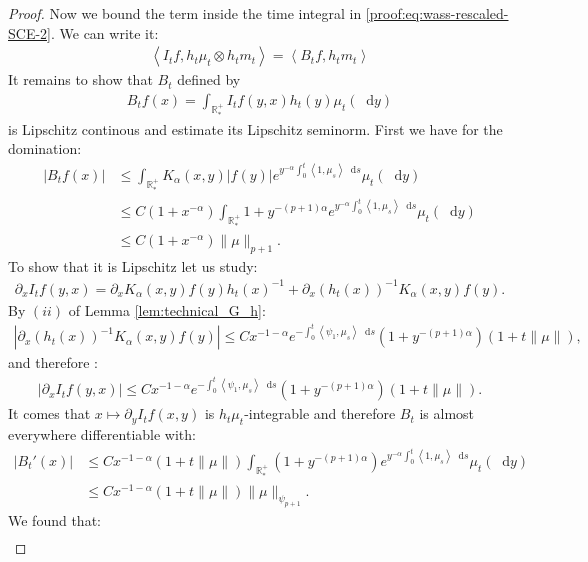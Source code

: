 \documentclass[11pt,a4paper]{article}
\newcommand{\RRP}{\mathbb{R}^+_*}
\newcommand{\brac}[1]{\left\langle#1\right\rangle}
\newcommand{\dd}{\mathop{}\!\mathrm{d}}
\begin{document}
\begin{proof}
    Now we bound the term inside the time integral in \eqref{proof:eq:wass-rescaled-SCE-2}. We can write it:
    \begin{align*}
        \brac{I_tf,h_t\mu_t \otimes h_t m_t} = \brac{B_tf,h_tm_t}
    \end{align*}
    It remains to show that $B_t$ defined by
    \begin{align*}
        B_tf(x) = \int_{\RRP} I_tf(y,x) h_t(y) \mu_t(\dd y)
    \end{align*}
    is Lipschitz continous and estimate its Lipschitz seminorm. First we have for the domination:
    \begin{align*}
        \left|B_tf(x) \right| 
        &\leq \int_{\RRP} K_\alpha(x,y)\left|f(y) \right| e^{ y^{-\alpha} \int_0^t \brac{1,\mu_s} \dd s} \mu_t(\dd y) \\
        &\leq C(1 + x^{-\alpha})\int_{\RRP} 1 + y^{-(p+1)\alpha} e^{y^{-\alpha}\int_0^t \brac{1,\mu_s} \dd s} \mu_t(\dd y) \\
        &\leq C(1 + x^{-\alpha}) \|\mu\|_{p+1}.
    \end{align*}
    To show that it is Lipschitz let us study:
    \begin{align*}
        \partial_x I_tf(y,x) = \partial_x K_\alpha(x,y)f(y)h_t(x)^{-1} + \partial_x \left(h_t(x)\right)^{-1} K_\alpha(x,y)f(y).
    \end{align*}
    By $(ii)$ of Lemma \ref{lem:technical_G_h}:
    \begin{align*}
        \left| \partial_x \left(h_t(x)\right)^{-1} K_\alpha(x,y)f(y)\right| \leq  C x^{-1-\alpha} e^{-\int_0^t \brac{\psi_1,\mu_s}\dd s}(1 + y^{-(p+1)\alpha}) (1 + t\|\mu\|),
    \end{align*}
    and therefore :
    \begin{align*}
        \left| \partial_x I_tf(y,x)\right| \leq C x^{-1-\alpha} e^{-\int_0^t \brac{\psi_1,\mu_s}\dd s} (1 + y^{-(p+1) \alpha}) (1 + t\|\mu\|).
    \end{align*}
    It comes that $x \mapsto \partial_y I_tf(x,y)$ is $h_t\mu_t$-integrable and therefore $B_t$ is almost everywhere differentiable with:
    \begin{align*}
        \left| B_t'(x)\right| 
        &\leq C x^{-1-\alpha} (1 + t\|\mu\|) \int_{\RRP} (1 + y^{-(p+1) \alpha}) e^{y^{-\alpha}\int_0^t \brac{1,\mu_s} \dd s} \mu_t(\dd y) \\
        &\leq C x^{-1-\alpha} (1 + t\|\mu\|) \|\mu\|_{\psi_{p+1}}.
    \end{align*}
    We found that:
    \begin{align*}

\end{align*}
\end{proof}
\end{document}
